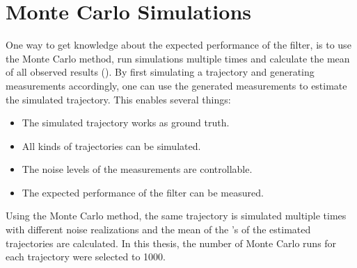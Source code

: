 \section{Monte Carlo Simulations}
One way to get knowledge about the expected performance of the filter, is to use the Monte Carlo method, \ie run simulations multiple times and calculate the mean of all observed results (\abbrRMSE).
By first simulating a trajectory and generating measurements accordingly, one can use the generated measurements to estimate the simulated trajectory.
This enables several things:
\begin{itemize}
	\item The simulated trajectory works as ground truth.
	\item All kinds of trajectories can be simulated.
	\item The noise levels of the measurements are controllable.
	\item The expected performance of the filter can be measured.
\end{itemize}
Using the Monte Carlo method, the same trajectory is simulated multiple times with different noise realizations and the mean of the \abbrRMSE's of the estimated trajectories are calculated.
In this thesis, the number of Monte Carlo runs for each trajectory were selected to 1000.
